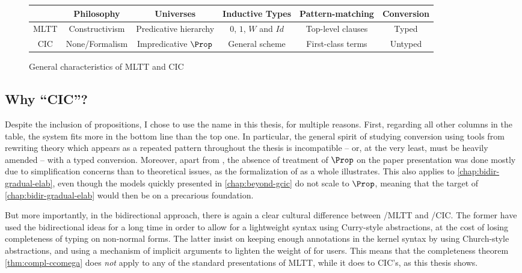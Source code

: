 \begin{figure*}[h]
  \begin{tabular}{cccccc}
    \rule{0pt}{4ex} & Philosophy & Universes & Inductive Types & Pattern-matching & Conversion \\
    \hline
    MLTT \rule{0pt}{4ex} & Constructivism & Predicative hierarchy & $0$, $1$, $W$ and $Id$ & Top-level clauses & Typed \\
    CIC \rule{0pt}{4ex} & None/Formalism & Impredicative $\Prop$ & General scheme & First-class terms & Untyped
  \end{tabular}
  \caption{General characteristics of MLTT and CIC}
  \label{fig:mltt-cic}
\end{figure*}

\subsection*{Why “CIC”?}

Despite the inclusion of propositions, I chose to use the name  in this thesis, for
multiple reasons. First, regarding all other columns in the table, the system fits more
in the bottom line than the top one. In particular, the general spirit of studying
conversion using tools from rewriting theory which appears as a repeated pattern throughout
the thesis is incompatible – or, at the very least, must be heavily amended –
with a typed conversion.
Moreover, apart from , the absence of
treatment of $\Prop$ on the paper presentation was done mostly due to simplification concerns
than to theoretical issues, as the formalization of  as a whole illustrates.
This also applies to \cref{chap:bidir-gradual-elab}, even though the models quickly presented
in \cref{chap:beyond-gcic} do not scale to $\Prop$, meaning that the target
of \cref{chap:bidir-gradual-elab} would then be on a precarious foundation.

But more importantly, in the bidirectional approach,
there is again a clear cultural difference between
/MLTT and /CIC. The former have used the bidirectional ideas for a long
time in order to allow for a lightweight syntax using Curry-style abstractions,
at the cost of losing completeness of typing on non-normal forms.%
%
The latter insist on keeping enough annotations in the kernel syntax by using Church-style
abstractions, and using a mechanism of implicit arguments to lighten the weight of
for users.
This means that the completeness theorem \cref{thm:compl-ccomega} does \emph{not} apply
to any of the standard presentations of MLTT, while it does to CIC’s, as this thesis shows.


